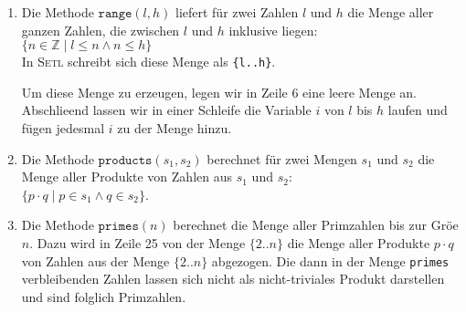 \begin{enumerate}
\item Die Methode $\texttt{range}(l, h)$ liefert f\"ur zwei Zahlen $l$ und $h$
      die Menge aller ganzen Zahlen, die zwischen $l$ und $h$ inklusive liegen:
      \\[0.2cm]
      \hspace*{1.3cm}
      $\{ n \in \mathbb{Z} \mid l \leq n \wedge n \leq h \}$
      \\[0.2cm]
      In \textsc{Setl} schreibt sich diese Menge als \texttt{\{l..h\}}.  

      Um diese Menge zu erzeugen, legen wir in Zeile 6 eine leere Menge an.
      Abschlie\3end lassen wir in einer Schleife die Variable $i$ von $l$ bis $h$ laufen
      und f\"ugen jedesmal $i$ zu der Menge hinzu.
\item Die Methode $\texttt{products}(s_1,s_2)$ berechnet f\"ur zwei Mengen $s_1$ und $s_2$
      die Menge aller Produkte von Zahlen aus $s_1$ und $s_2$:
      \\[0.2cm]
      \hspace*{1.3cm}
      $\{ p \cdot q \mid p \in s_1 \wedge q \in s_2 \}$.
\item Die Methode $\mathtt{primes}(n)$ berechnet die Menge aller Primzahlen bis zur Gr\"o\3e
      $n$.   Dazu wird in Zeile 25 von der Menge $\{2 .. n\}$ die Menge
      aller Produkte $p \cdot q$ von Zahlen aus der Menge $\{2 .. n \}$
      abgezogen.  Die dann in der Menge \texttt{primes} verbleibenden Zahlen lassen sich
      nicht als nicht-triviales Produkt darstellen und sind folglich Primzahlen.
\end{enumerate}

